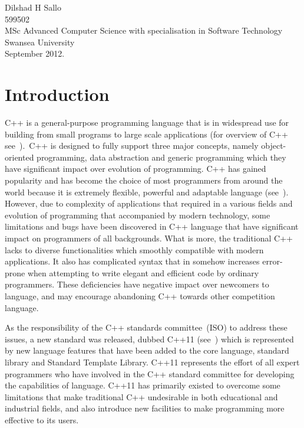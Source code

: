 \documentclass[11pt]{report}
\begin{document}
\begin{flushright}
Dilshad H Sallo\\
599502\\
MSc Advanced Computer Science with specialisation in Software Technology\\
Swansea University\\
September 2012.
\end{flushright}

\tableofcontents

\chapter{Introduction}
\label{cha:intro}
C++ is a general-purpose programming language that is in widespread use for building from small programs to large scale applications (for overview of C++ see~\cite{Stroustrup:2012:Cpp11}).~C++ is designed to fully support three major concepts, namely object-oriented programming, data abstraction and generic programming which they have significant impact over evolution of programming. C++ has gained popularity and has become the choice of most programmers from around the world because it is extremely flexible, powerful and adaptable language (see~\cite{Stroustrup:2012:Cpp11}). However, due to complexity of applications that required in a various fields and evolution of programming that accompanied by modern technology, some limitations and bugs have been discovered in C++ language that have significant impact on programmers of all backgrounds. What is more, the traditional C++ lacks to diverse functionalities which smoothly compatible with modern applications. It also has complicated syntax that in somehow increases error-prone when attempting to write elegant and efficient code by ordinary programmers. These deficiencies have negative impact over newcomers to language, and may encourage abandoning C++ towards other competition language.

As the responsibility of the C++ standards committee~(ISO) to address these issues, a new standard was released, dubbed C++11 (see~\cite{Stroustrup:2012:Cpp11}) which is represented by new language features that have been added to the core language, standard library and Standard Template Library. C++11 represents the effort of all expert programmers who have involved in the C++ standard committee for developing the capabilities of language. C++11 has primarily existed to overcome some limitations that make traditional C++  undesirable in both educational and industrial fields, and also introduce new facilities to make programming more effective to its users.
\end{document}
